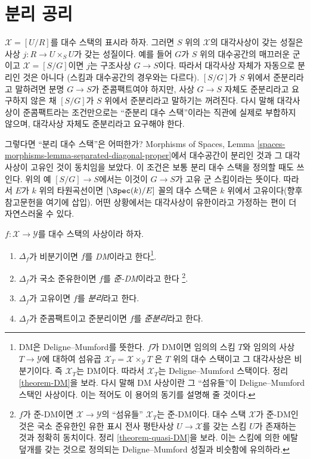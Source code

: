 \section{분리 공리}
\label{section-separated}

\noindent
$\mathcal{X} = [U/R]$를 대수 스택의 표시라 하자. 그러면 $S$ 위의
$\mathcal{X}$의 대각사상이 갖는 성질은 사상
$j : R \to U \times_S U$가 갖는 성질이다. 예를 들어
$G$가 $S$ 위의 대수공간의 매끄러운 군이고
$\mathcal{X} = [S/G]$이면 $j$는 구조사상 $G \to S$이다.
따라서 대각사상 자체가 자동으로 분리인 것은 아니다
(스킴과 대수공간의 경우와는 다르다). $[S/G]$가 $S$ 위에서
준분리라고 말하려면 분명 $G \to S$가 준콤팩트여야 하지만,
사상 $G \to S$ 자체도 준분리라고 요구하지 않은 채 $[S/G]$가
$S$ 위에서 준분리라고 말하기는 꺼려진다. 다시 말해 대각사상이
준콤팩트라는 조건만으로는 ``준분리 대수 스택''이라는 직관에
실제로 부합하지 않으며, 대각사상 자체도 준분리라고 요구해야 한다.

\medskip\noindent
그렇다면 ``분리 대수 스택''은 어떠한가? Morphisms of Spaces,
Lemma \ref{spaces-morphisms-lemma-separated-diagonal-proper}에서
대수공간이 분리인 것과 그 대각사상이 고유인 것이 동치임을 보았다.
이 조건은 보통 분리 대수 스택을 정의할 때도 쓰인다.
위의 예 $[S/G] \to S$에서는 이것이 $G \to S$가 고유 군 스킴이라는
뜻이다. 따라서 $E$가 $k$ 위의 타원곡선이면 $[\Spec(k)/E]$ 꼴의
대수 스택은 $k$ 위에서 고유이다(향후 참고문헌을 여기에 삽입).
어떤 상황에서는 대각사상이 유한이라고 가정하는 편이 더 자연스러울 수 있다.

\begin{definition}
\label{definition-separated}
$f : \mathcal{X} \to \mathcal{Y}$를 대수 스택의 사상이라 하자.
\begin{enumerate}
\item $\Delta_f$가 비분기이면 $f$를 {\it DM}이라고 한다\footnote{
DM은 Deligne--Mumford를 뜻한다. $f$가 DM이면 임의의 스킴 $T$와
임의의 사상 $T \to \mathcal{Y}$에 대하여 섬유곱
$\mathcal{X}_T = \mathcal{X} \times_\mathcal{Y} T$
은 $T$ 위의 대수 스택이고 그 대각사상은 비분기이다. 즉
$\mathcal{X}_T$는 DM이다. 따라서 $\mathcal{X}_T$는
Deligne--Mumford 스택이다. 정리 \ref{theorem-DM}을 보라.
다시 말해 DM 사상이란 그 ``섬유들''이 Deligne--Mumford 스택인
사상이다. 이는 적어도 이 용어의 동기를 설명해 줄 것이다.}.
\item $\Delta_f$가 국소 준유한이면 $f$를 {\it 준-DM}이라고 한다
\footnote{$f$가 준-DM이면 $\mathcal{X} \to \mathcal{Y}$의
``섬유들'' $\mathcal{X}_T$는 준-DM이다. 대수 스택
$\mathcal{X}$가 준-DM인 것은 국소 준유한인 유한 표시 전사 평탄사상
$U \to \mathcal{X}$를 갖는 스킴 $U$가 존재하는 것과 정확히 동치이다.
정리 \ref{theorem-quasi-DM}을 보라. 이는 스킴에 의한 에탈 덮개를
갖는 것으로 정의되는 Deligne--Mumford 성질과 비슷함에 유의하라.}.
\item $\Delta_f$가 고유이면 $f$를 {\it 분리}라고 한다.
\item $\Delta_f$가 준콤팩트이고 준분리이면
$f$를 {\it 준분리}라고 한다.
\end{enumerate}
\end{definition}

